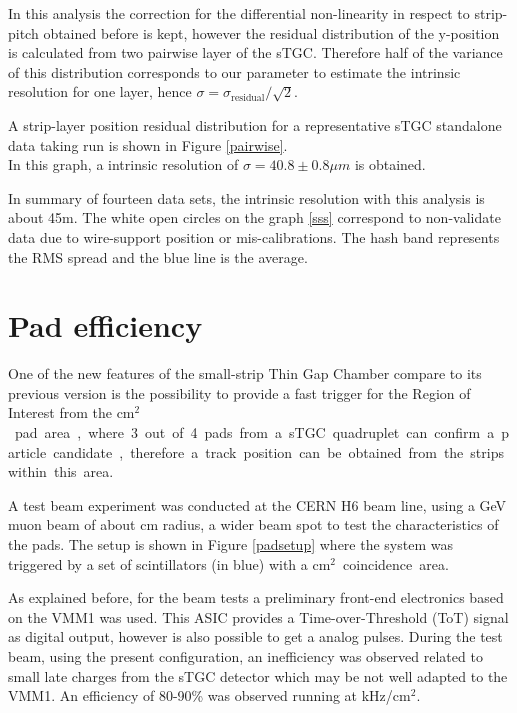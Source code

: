 In this analysis the correction for the differential non-linearity in respect to strip-pitch obtained before is kept,
however the residual distribution of the y-position is calculated from two pairwise layer of the sTGC.  Therefore half
of the variance of this distribution corresponds to our parameter to estimate the intrinsic resolution for one layer,
hence $\sigma = \sigma_{\mathrm{residual}}/\sqrt{2}$. \par
A strip-layer position residual distribution for a representative sTGC standalone data taking run is shown in Figure
\ref{pairwise}.\\ In this graph, a intrinsic resolution of $\sigma=40.8\pm0.8\mu m$ is obtained.

In summary of fourteen data sets, the intrinsic resolution with this analysis is about \unit{45}{\micro m}. The white
open circles on the graph \ref{sss} correspond to non-validate data due to wire-support position or mis-calibrations.
The hash band represents the RMS spread and the blue line is the average.\par 



\section{Pad efficiency}\label{padeff}

One of the new features of the small-strip Thin Gap Chamber compare to its previous version is the possibility to
provide a fast trigger for the Region of Interest from the \unit[8x50]{cm$^2$} pad area, where 3 out of 4 pads from a
sTGC quadruplet can confirm a particle candidate, therefore a track position can be obtained from the strips within this
area.\par

A test beam experiment was conducted at the CERN H6 beam line, using a \unit[130]{GeV} muon beam of about \unit[4]{cm}
radius, a wider beam spot to test the characteristics of the pads. The setup is shown in Figure \ref{padsetup} where the
system was triggered by a set of scintillators (in blue) with a \unit[12x12]{cm$^2$} coincidence area.\par

As explained before, for the beam tests a preliminary front-end electronics based on the VMM1 was used. This ASIC
provides a Time-over-Threshold (ToT) signal as digital output, however is also possible to get a analog pulses.  During the
test beam, using the present configuration, an inefficiency was observed related to small late charges from the sTGC
detector which may be not well adapted to the VMM1. An efficiency of 80-90\% was observed running at
\unit[100]{kHz/cm$^2$}.\par


